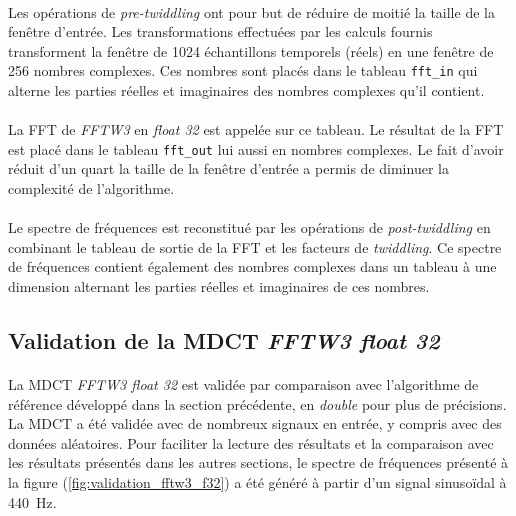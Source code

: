 \documentclass{article}
\begin{document}
    \paragraph{}
    Les opérations de \emph{pre-twiddling} ont pour but de réduire de moitié la taille de la fenêtre d'entrée. Les transformations effectuées par les calculs fournis transforment la fenêtre de 1024 échantillons temporels (réels) en une fenêtre de 256 nombres complexes. Ces nombres sont placés dans le tableau \texttt{fft\_in} qui alterne les parties réelles et imaginaires des nombres complexes qu'il contient.

    \paragraph{}
    La FFT de \emph{FFTW3} en \emph{float 32} est appelée sur ce tableau. Le résultat de la FFT est placé dans le tableau \texttt{fft\_out} lui aussi en nombres complexes. Le fait d'avoir réduit d'un quart la taille de la fenêtre d'entrée a permis de diminuer la complexité de l'algorithme.

    \paragraph{}
    Le spectre de fréquences est reconstitué par les opérations de \emph{post-twiddling} en combinant le tableau de sortie de la FFT et les facteurs de \emph{twiddling}. Ce spectre de fréquences contient également des nombres complexes dans un tableau à une dimension alternant les parties réelles et imaginaires de ces nombres.


    \subsection{Validation de la MDCT \emph{FFTW3 float 32}}
    \paragraph{}
    La MDCT \emph{FFTW3 float 32} est validée par comparaison avec l'algorithme de référence développé dans la section précédente, en \emph{double} pour plus de précisions. La MDCT a été validée avec de nombreux signaux en entrée, y compris avec des données aléatoires. Pour faciliter la lecture des résultats et la comparaison avec les résultats présentés dans les autres sections, le spectre de fréquences présenté à la figure (\ref{fig:validation_fftw3_f32}) a été généré à partir d'un signal sinusoïdal à \SI{440}{\hertz}.
\end{document}
